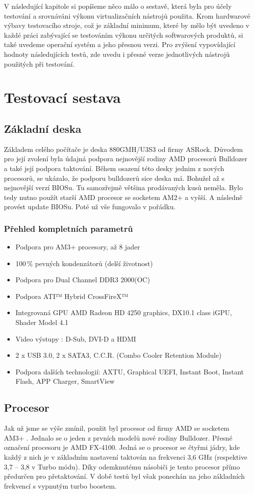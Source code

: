 V následující kapitole si popíšeme něco málo o sestavě, která byla pro účely testování a srovnáváni výkonu virtualizačních nástrojů použita. Krom hardwarové výbavy testovacího stroje, což je základní minimum, které by mělo být uvedeno v každé práci zabývající se testováním výkonu určitých softwarových produktů, si také uvedeme operační systém a jeho přesnou verzi. Pro zvýšení vypovídající hodnoty následujících testů, zde uvedu i přesné verze jednotlivých nástrojů použitých při testování.

\section{Testovací sestava}
\subsection{Základní deska}
Základem celého počítače je deska 880GMH/U3S3 od firmy ASRock. Důvodem pro její zvolení byla údajná podpora nejnovější rodiny AMD procesorů Bulldozer a také její podpora taktování. Během osazení této desky jednim z nových procesorů, se ukázalo, že podporu bulldozerů sice deska má. Bohužel až s nejnovější verzí BIOSu. Tu samozřejmě většina prodávaných kusů neměla. Bylo tedy nutno použít starší AMD procesor se socketem AM2+ a vyšší. A následně provést update BIOSu. Poté už vše fungovalo v pořádku.
\subsubsection{Přehled kompletních parametrů}
\begin{itemize}
  \item Podpora pro AM3+ procesory, až 8 jader
  \item 100\,\% pevných kondenzátorů (delší životnost) 
  \item Podpora pro Dual Channel DDR3 2000(OC)
  \item Podpora ATI™ Hybrid CrossFireX™
  \item Integrovaná GPU AMD Radeon HD 4250 graphics, DX10.1 class iGPU, Shader Model 4.1
  \item Video výstupy : D-Sub, DVI-D a HDMI
  \item 2 x USB 3.0, 2 x SATA3, C.C.R. (Combo Cooler Retention Module)
  \item Podpora dalších technologií: AXTU, Graphical UEFI, Instant Boot, Instant Flash, APP Charger, SmartView
\end{itemize}

\subsection{Procesor}
Jak už jsme se výše zmínil, použit byl procesor od firmy AMD se socketem AM3+ . Jednalo se o jeden z prvních modelů nové rodiny Bulldozer. Přesné označení procesoru je AMD FX-4100. Jedná se o procesor se čtyřmi jádry, kde každý z nich je v základním nastavení taktován na frekvenci 3,6 GHz (respektive 3,7 -- 3,8 v Turbo módu). Díky odemknutému násobiči je tento procesor přímo předurčen pro přetaktování. V době testů byl však ponechán na jeho základních frekvencí s vypnutým turbo boostem.

